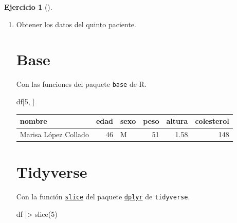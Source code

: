 \documentclass[
  a4paper,
]{scrreport}
\newenvironment{Shaded}{\begin{snugshade}}{\end{snugshade}}
\newcommand{\DecValTok}[1]{\textcolor[rgb]{0.68,0.00,0.00}{#1}}
\newcommand{\FunctionTok}[1]{\textcolor[rgb]{0.28,0.35,0.67}{#1}}
\newcommand{\NormalTok}[1]{\textcolor[rgb]{0.00,0.23,0.31}{#1}}
\newcommand{\SpecialCharTok}[1]{\textcolor[rgb]{0.37,0.37,0.37}{#1}}
\theoremstyle{definition}
\newtheorem{exercise}{Ejercicio}[chapter]
\theoremstyle{remark}
\begin{document}
\begin{exercise}[]
\begin{enumerate}
\begin{tcolorbox}
  \end{tcolorbox}
\item
  Obtener los datos del quinto paciente.

  \begin{tcolorbox}[enhanced jigsaw, colframe=quarto-callout-tip-color-frame, toprule=.15mm, bottomtitle=1mm, breakable, opacitybacktitle=0.6, toptitle=1mm, colback=white, bottomrule=.15mm, title=\textcolor{quarto-callout-tip-color}{\faLightbulb}\hspace{0.5em}{Solución}, arc=.35mm, left=2mm, titlerule=0mm, rightrule=.15mm, coltitle=black, leftrule=.75mm, opacityback=0, colbacktitle=quarto-callout-tip-color!10!white]

  \section{Base}

  Con las funciones del paquete \texttt{base} de R.

\begin{Shaded}
\begin{Highlighting}[]
\NormalTok{df[}\DecValTok{5}\NormalTok{, ]}
\end{Highlighting}
\end{Shaded}

  \begin{longtable}[]{@{}lrlrrr@{}}
  \toprule\noalign{}
  nombre & edad & sexo & peso & altura & colesterol \\
  \midrule\noalign{}
  \endhead
  \bottomrule\noalign{}
  \endlastfoot
  Marisa López Collado & 46 & M & 51 & 1.58 & 148 \\
  \end{longtable}

  \section{Tidyverse}

  Con la función
  \href{https://dplyr.tidyverse.org/reference/slice.html}{\texttt{slice}}
  del paquete
  \href{https://dplyr.tidyverse.org/index.html}{\texttt{dplyr}} de
  \texttt{tidyverse}.

\begin{Shaded}
\begin{Highlighting}[]
\NormalTok{df }\SpecialCharTok{|\textgreater{}} \FunctionTok{slice}\NormalTok{(}\DecValTok{5}\NormalTok{)}
\end{Highlighting}
\end{Shaded}


\end{tcolorbox}
\end{enumerate}
\end{exercise}
\end{document}

